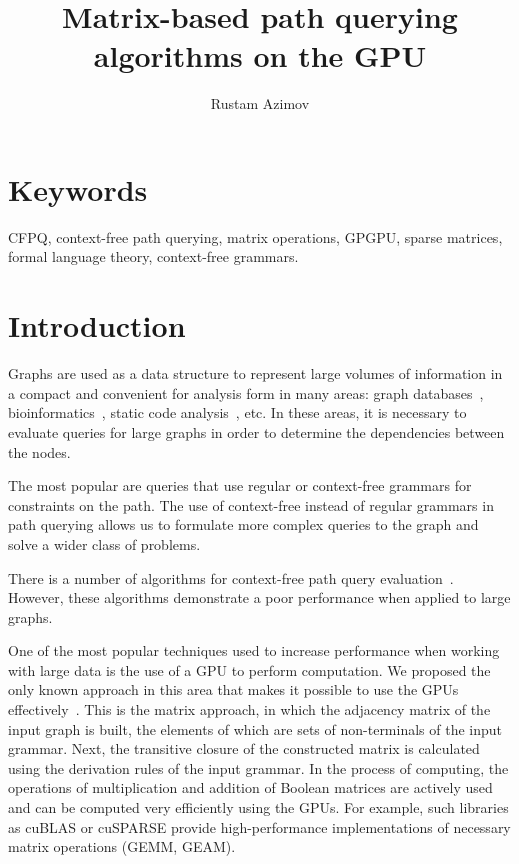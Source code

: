 \documentclass[12pt]{article}  %
\title{Matrix-based path querying algorithms on the GPU}
\author{Rustam Azimov}
\date{}
\theoremstyle{remark}
\begin{document}

\maketitle

\section*{Keywords}
CFPQ, context-free path querying, matrix operations, GPGPU, sparse matrices, formal language theory, context-free grammars.

\section{Introduction}
Graphs are used as a data structure to represent large volumes of information in a compact and convenient for analysis form in many areas: graph databases~\cite{graphDB}, bioinformatics~\cite{Bio}, static code analysis~\cite{kodumal2004set, zhang2013fast}, etc. In these areas, it is necessary to evaluate queries for large graphs in order to determine the dependencies between the nodes. 

The most popular are queries that use regular or context-free grammars for constraints on the path. The use of context-free instead of regular grammars in path querying allows us to formulate more complex queries to the graph and solve a wider class of problems.

There is a number of algorithms for context-free path query evaluation~\cite{GLL, hellingsRelational, RDF, GraphQueryWithEarley}. However, these algorithms demonstrate a poor performance when applied to large graphs.

One of the most popular techniques used to increase performance when working with large data is the use of a GPU to perform computation. We proposed the only known approach in this area that makes it possible to use the GPUs effectively~\cite{azimov2018context}. This is the matrix approach, in which the adjacency matrix of the input graph is built, the elements of which are sets of non-terminals of the input grammar. Next, the transitive closure of the constructed matrix is calculated using the derivation rules of the input grammar. In the process of computing, the operations of multiplication and addition of Boolean matrices are actively used and can be computed very efficiently using the GPUs. For example, such libraries as cuBLAS or cuSPARSE provide high-performance implementations of necessary matrix operations (GEMM, GEAM).
\end{document}

